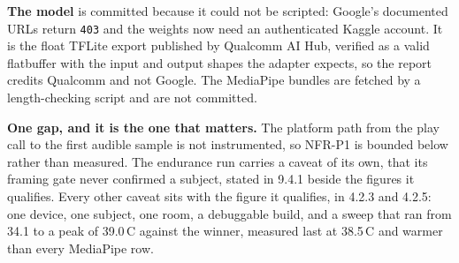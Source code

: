 \textbf{The model} is committed because it could not be scripted: Google's
documented URLs return \texttt{403} and the weights now need an authenticated
Kaggle account. It is the float TFLite export published by Qualcomm AI Hub,
verified as a valid flatbuffer with the input and output shapes the adapter
expects, so the report credits Qualcomm and not Google. The
MediaPipe bundles are fetched by a length-checking script and are not
committed.

\textbf{One gap, and it is the one that matters.} The platform path from the
play call to the first audible sample is not instrumented, so NFR-P1 is
bounded below rather than measured. The endurance run carries a caveat of its
own, that its framing gate never confirmed a subject, stated in 9.4.1 beside
the figures it qualifies. Every other caveat sits with the figure it qualifies, in 4.2.3 and
4.2.5: one device, one subject, one room, a debuggable build, and a sweep
that ran from 34.1 to a peak of 39.0\,\textdegree C against the winner,
measured last at 38.5\,\textdegree C and warmer than every MediaPipe row.
